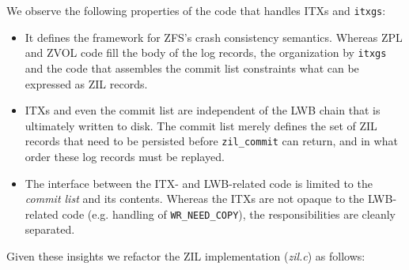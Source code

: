 \documentclass[12pt,a4paper,twoside]{book}
\begin{document}
We observe the following properties of the code that handles ITXs and \lstinline{itxgs}:
\begin{itemize}[noitemsep]
    \item It defines the framework for ZFS's crash consistency semantics.
          Whereas ZPL and ZVOL code fill the body of the log records, the organization by \lstinline{itxgs} and the code that assembles the commit list constraints what can be expressed as ZIL records.
    \item ITXs and even the commit list are independent of the LWB chain that is ultimately written to disk.
          The commit list merely defines the set of ZIL records that need to be persisted before \lstinline{zil_commit} can return, and in what order these log records must be replayed.
    \item The interface between the ITX- and LWB-related code is limited to the \textit{commit list} and its contents.
          Whereas the ITXs are not opaque to the LWB-related code (e.g. handling of \lstinline{WR_NEED_COPY}), the responsibilities are cleanly separated.
\end{itemize}
Given these insights we refactor the ZIL implementation (\textit{zil.c}) as follows:
\end{document}
